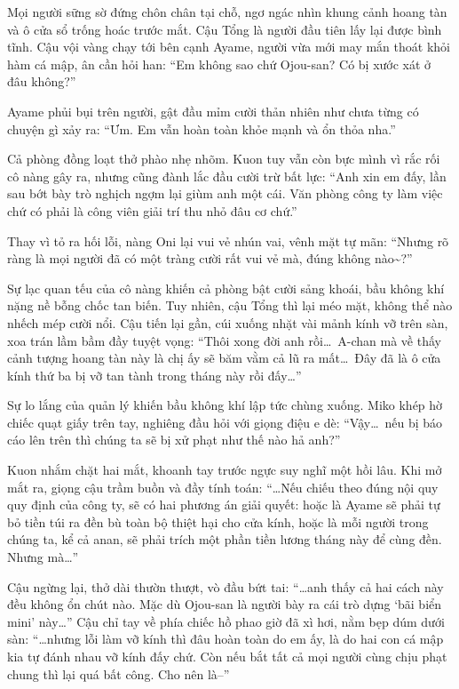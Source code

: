 \documentclass[../main.tex]{subfiles}
\begin{document}
Mọi người sững sờ đứng chôn chân tại chỗ, ngơ ngác nhìn khung cảnh hoang tàn và ô cửa sổ trống hoác trước mắt. Cậu Tổng là người đầu tiên lấy lại được bình tĩnh. Cậu vội vàng chạy tới bên cạnh Ayame, người vừa mới may mắn thoát khỏi hàm cá mập, ân cần hỏi han:
``Em không sao chứ Ojou-san? Có bị xước xát ở đâu không?''

Ayame phủi bụi trên người, gật đầu mỉm cười thản nhiên như chưa từng có chuyện gì xảy ra:
``Ưm. Em vẫn hoàn toàn khỏe mạnh và ổn thỏa nha.''

Cả phòng đồng loạt thở phào nhẹ nhõm. Kuon tuy vẫn còn bực mình vì rắc rối cô nàng gây ra, nhưng cũng đành lắc đầu cười trừ bất lực:
``Anh xin em đấy, lần sau bớt bày trò nghịch ngợm lại giùm anh một cái. Văn phòng công ty làm việc chứ có phải là công viên giải trí thu nhỏ đâu cơ chứ.''

Thay vì tỏ ra hối lỗi, nàng Oni lại vui vẻ nhún vai, vênh mặt tự mãn:
``Nhưng rõ ràng là mọi người đã có một tràng cười rất vui vẻ mà, đúng không nào\~{}?''

Sự lạc quan tếu của cô nàng khiến cả phòng bật cười sảng khoái, bầu không khí nặng nề bỗng chốc tan biến. Tuy nhiên, cậu Tổng thì lại méo mặt, không thể nào nhếch mép cười nổi. Cậu tiến lại gần, cúi xuống nhặt vài mảnh kính vỡ trên sàn, xoa trán lầm bầm đầy tuyệt vọng:
``Thôi xong đời anh rồi\dots\ A-chan mà về thấy cảnh tượng hoang tàn này là chị ấy sẽ băm vằm cả lũ ra mất\dots\ Đây đã là ô cửa kính thứ ba bị vỡ tan tành trong tháng này rồi đấy\dots''

Sự lo lắng của quản lý khiến bầu không khí lập tức chùng xuống. Miko khép hờ chiếc quạt giấy trên tay, nghiêng đầu hỏi với giọng điệu e dè:
``Vậy\dots\ nếu bị báo cáo lên trên thì chúng ta sẽ bị xử phạt như thế nào hả anh?''

Kuon nhắm chặt hai mắt, khoanh tay trước ngực suy nghĩ một hồi lâu. Khi mở mắt ra, giọng cậu trầm buồn và đầy tính toán:
``\dots Nếu chiếu theo đúng nội quy quy định của công ty, sẽ có hai phương án giải quyết: hoặc là Ayame sẽ phải tự bỏ tiền túi ra đền bù toàn bộ thiệt hại cho cửa kính, hoặc là mỗi người trong chúng ta, kể cả anan, sẽ phải trích một phần tiền lương tháng này để cùng đền. Nhưng mà\dots''

Cậu ngừng lại, thở dài thườn thượt, vò đầu bứt tai:
``\dots anh thấy cả hai cách này đều không ổn chút nào. Mặc dù Ojou-san là người bày ra cái trò dựng `bãi biển mini' này\dots'' Cậu chỉ tay về phía chiếc hồ phao giờ đã xì hơi, nằm bẹp dúm dưới sàn: ``\dots nhưng lỗi làm vỡ kính thì đâu hoàn toàn do em ấy, là do hai con cá mập kia tự đánh nhau vỡ kính đấy chứ. Còn nếu bắt tất cả mọi người cùng chịu phạt chung thì lại quá bất công. Cho nên là--''
\end{document}
